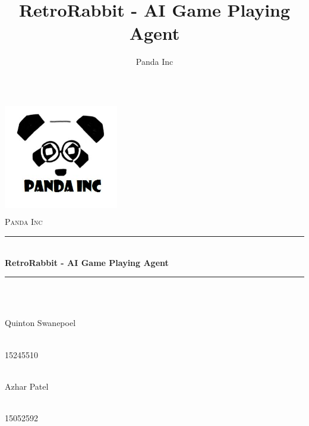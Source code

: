 \documentclass[11pt]{article}
\author{Panda Inc}
\title{RetroRabbit - AI Game Playing Agent}
\begin{document}
\begin{titlepage}
	
	\begin{center}
        \includegraphics[width=5cm, height=5cm]{Images/PandaInc_logo.jpg}\\[0cm] 
		\textsc{\LARGE Panda Inc}\\[0.3cm]
		\rule{\linewidth}{0.5mm} \\[1cm]
		{ \huge \bfseries RetroRabbit - AI Game Playing Agent}\\[0.5cm]
		\rule{\linewidth}{0.5mm} \\[1cm] 		
  
		
		\begin{minipage}{0.4\textwidth}
			\begin{flushleft} \large
				\emph{} \\
				Quinton {Swanepoel}
			\end{flushleft}
		\end{minipage}
		\begin{minipage}{0.4\textwidth}
			\begin{flushright} \large
				\emph{} \\
				15245510
			\end{flushright}
		\end{minipage}

		\begin{minipage}{0.4\textwidth}
			\begin{flushleft} \large
            	\emph{} \\
				Azhar {Patel}
			\end{flushleft}
		\end{minipage}
		\begin{minipage}{0.4\textwidth}
			\begin{flushright} \large
				\emph{} \\
				15052592
			\end{flushright}
		\end{minipage}
		

\end{center}
\end{titlepage}
\end{document}
